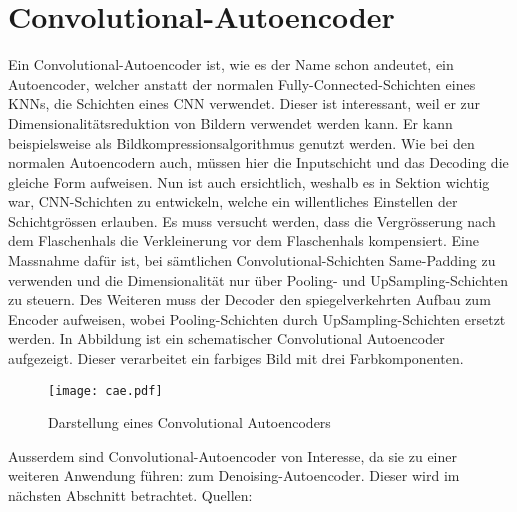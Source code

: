\section{Convolutional-Autoencoder}\label{sec:convolutional_autoencoder}
Ein Convolutional-Autoencoder ist, wie es der Name schon andeutet, ein Autoencoder,
welcher anstatt der normalen Fully-Connected-Schichten eines KNNs, die Schichten eines CNN verwendet.
Dieser ist interessant, weil er zur Dimensionalitätsreduktion von Bildern
verwendet werden kann. Er kann beispielsweise als Bildkompressionsalgorithmus
genutzt werden.
\para{}
Wie bei den normalen Autoencodern auch, müssen hier die Inputschicht und das
Decoding die gleiche Form aufweisen. Nun ist auch ersichtlich, weshalb es in
Sektion  wichtig war, CNN-Schichten zu
entwickeln, welche ein willentliches Einstellen der Schichtgrössen erlauben.
Es muss versucht werden, dass die Vergrösserung nach dem Flaschenhals die
Verkleinerung vor dem Flaschenhals kompensiert.
Eine Massnahme dafür ist, bei sämtlichen Convolutional-Schichten Same-Padding zu
verwenden und die Dimensionalität nur über Pooling- und UpSampling-Schichten zu
steuern. Des Weiteren muss der Decoder den spiegelverkehrten Aufbau zum Encoder
aufweisen, wobei Pooling-Schichten durch UpSampling-Schichten ersetzt werden.
\para{}
In Abbildung  ist ein schematischer
Convolutional Autoencoder aufgezeigt. Dieser verarbeitet ein farbiges Bild mit
drei Farbkomponenten.
\para{}
\begin{figure}[h!]
  \centering
  \texttt{[image: cae.pdf]}
  \caption{Darstellung eines Convolutional Autoencoders}
  \label{fig:convolutional_autoencoder}
\end{figure}
\para{}
Ausserdem sind Convolutional-Autoencoder von Interesse, da sie zu einer weiteren
Anwendung führen: zum Denoising-Autoencoder.
Dieser wird im nächsten Abschnitt betrachtet.
\para{}
Quellen: \cite{yt:autoencoder_faces}

